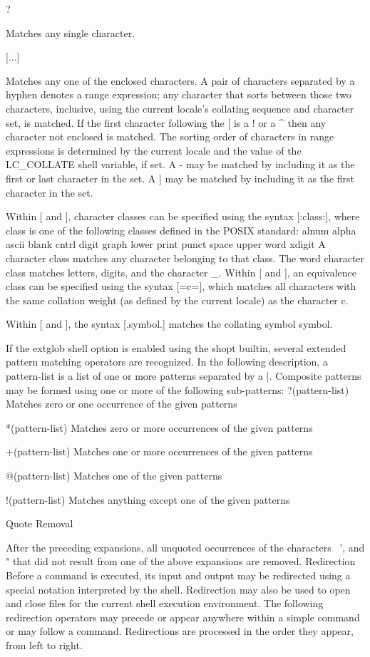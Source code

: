\documentclass[11pt]{article}
\begin{document}
{{{?

Matches any single character.

[...]

Matches any one of the enclosed characters. A pair of characters separated by a hyphen denotes a range expression; any character that sorts between those two characters, inclusive, using the current locale's collating sequence and character set, is matched. If the first character following the [ is a ! or a ^ then any character not enclosed is matched. The sorting order of characters in range expressions is determined by the current locale and the value of the LC_COLLATE shell variable, if set. A - may be matched by including it as the first or last character in the set. A ] may be matched by including it as the first character in the set.

Within [ and ], character classes can be specified using the syntax [:class:], where class is one of the following classes defined in the POSIX standard:
alnum alpha ascii blank cntrl digit graph lower print punct space upper word xdigit
A character class matches any character belonging to that class. The word character class matches letters, digits, and the character _.
Within [ and ], an equivalence class can be specified using the syntax [=c=], which matches all characters with the same collation weight (as defined by the current locale) as the character c.

Within [ and ], the syntax [.symbol.] matches the collating symbol symbol.

If the extglob shell option is enabled using the shopt builtin, several extended pattern matching operators are recognized. In the following description, a pattern-list is a list of one or more patterns separated by a |. Composite patterns may be formed using one or more of the following sub-patterns:
?(pattern-list)
Matches zero or one occurrence of the given patterns

*(pattern-list)
Matches zero or more occurrences of the given patterns

+(pattern-list)
Matches one or more occurrences of the given patterns

@(pattern-list)
Matches one of the given patterns

!(pattern-list)
Matches anything except one of the given patterns

Quote Removal

After the preceding expansions, all unquoted occurrences of the characters \, ', and " that did not result from one of the above expansions are removed.
Redirection
Before a command is executed, its input and output may be redirected using a special notation interpreted by the shell. Redirection may also be used to open and close files for the current shell execution environment. The following redirection operators may precede or appear anywhere within a simple command or may follow a command. Redirections are processed in the order they appear, from left to right.

}}}
\end{document}
